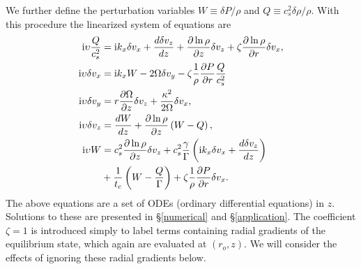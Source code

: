 We further define the perturbation variables  $W \equiv \delta P /\rho$ 
and $Q \equiv c_s^2\delta\rho/\rho$.  With this procedure the linearized
system of equations are
\begin{align}
  \mathrm{i}\upsilon \frac{Q}{c_s^2}  &=  \mathrm{i} k_x \delta v_x + \frac{d\delta
    v_z}{dz} + \frac{\partial\ln{\rho}}{\partial z}\delta v_z + \zeta
  \frac{\partial\ln{\rho}}{\partial r} \delta v_x,\label{lin_mass}\\
  \mathrm{i}\upsilon \delta v_x  &= \mathrm{i} k_x W - 2\Omega\delta v_y -
  \zeta\frac{1}{\rho}\frac{\partial P}{\partial r}\frac{Q}{c_s^2}\label{lin_vx}\\
   \mathrm{i} \upsilon\delta v_y &= r\frac{\partial \Omega}{\partial z}\delta v_z +
  \frac{\kappa^2}{2\Omega}\delta v_x, \label{lin_vy}\\
   \mathrm{i}\upsilon\delta v_z &= \frac{dW}{dz} +
  \frac{\partial\ln{\rho}}{\partial z}\left(W-Q\right), \label{lin_vz}\\
  \mathrm{i} \upsilon W &= c_s^2\frac{\partial\ln{\rho}}{\partial z}\delta v_z +
  c_s^2\frac{\gamma}{\Gamma} \left(\mathrm{i} k_x\delta v_x + \frac{d\delta
      v_z}{dz}\right) \notag\\
  &+ \frac{1}{t_c}\left(W - \frac{Q}{\Gamma}\right) +
  \zeta\frac{1}{\rho}\frac{\partial P}{\partial r}\delta v_x.\label{lin_energy}
\end{align}
The above equations are a set of ODEs (ordinary differential equations) in $z$.  Solutions to these 
are presented in \S\ref{numerical} and \S\ref{application}.   The coefficient $ \zeta = 1$ is 
introduced simply to label terms containing radial gradients of the equilibrium state, 
which again are evaluated at $(r_o, z)$.   We will consider the effects of ignoring these radial gradients below. 



